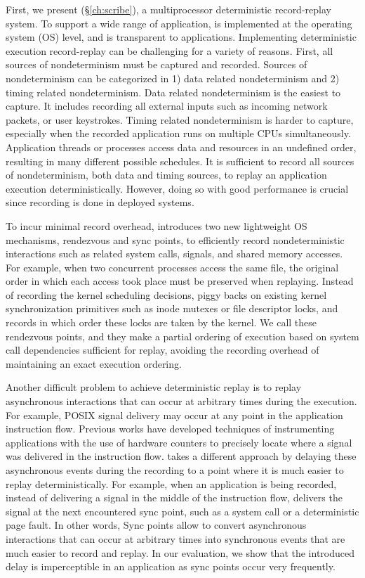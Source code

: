 First, we present \scribe (\S\ref{ch:scribe}), a multiprocessor deterministic
record-replay system. To support a wide range of application, \scribe is
implemented at the operating system (OS) level, and is transparent to applications.
Implementing deterministic execution record-replay can be challenging for a
variety of reasons. First, all sources of nondeterminism must be captured and
recorded.  Sources of nondeterminism can be categorized in 1) data related
nondeterminism and 2) timing related nondeterminism. Data related nondeterminism
is the easiest to capture. It includes recording all external inputs such as
incoming network packets, or user keystrokes. Timing related nondeterminism is
harder to capture, especially when the recorded application runs on multiple
CPUs simultaneously.  Application threads or processes access data and resources
in an undefined order, resulting in many different possible schedules. It is
sufficient to record all sources of nondeterminism, both data and timing
sources, to replay an application execution deterministically.  However, doing
so with good performance is crucial since recording is done in deployed systems.

To incur minimal record overhead, \scribe introduces two new lightweight OS
mechanisms, rendezvous and sync points, to efficiently record nondeterministic
interactions such as related system calls, signals, and shared memory accesses.
For example, when two concurrent processes access the same file, the original
order in which each access took place must be preserved when replaying.  Instead
of recording the kernel scheduling decisions, \scribe piggy backs on existing
kernel synchronization primitives such as inode mutexes or file descriptor
locks, and records in which order these locks are taken by the kernel.  We call
these rendezvous points, and they make a partial ordering of execution based on
system call dependencies sufficient for replay, avoiding the recording overhead
of maintaining an exact execution ordering.

Another difficult problem to achieve deterministic replay is to replay
asynchronous interactions that can occur at arbitrary times during the
execution. For example, POSIX signal delivery may occur at any point in the
application instruction flow. Previous works have developed techniques
of instrumenting applications with the use of hardware counters to precisely
locate where a signal was delivered in the instruction flow.
\scribe takes a different approach by delaying these asynchronous events
during the recording to a point where it is much easier to replay
deterministically. For example, when an application is being recorded,
instead of delivering a signal in the middle of the instruction flow, \scribe
delivers the signal at the next encountered sync point, such as a system call or
a deterministic page fault. In other words,
Sync points allow \scribe to convert asynchronous interactions that can occur at
arbitrary times into synchronous events that are much easier to record and
replay. In our evaluation, we show that the introduced delay is imperceptible
in an application as sync points occur very frequently.

